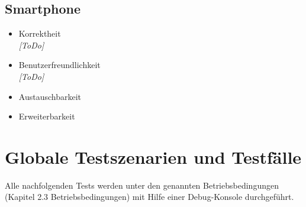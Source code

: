 \documentclass[10pt,a4paper]{article}
\begin{document}
		\subsection{Smartphone}
			\begin{itemize}
				\item Korrektheit
					\\ \textsl{[ToDo]}
				\item Benutzerfreundlichkeit
					\\ \textsl{[ToDo]}
				\item Austauschbarkeit
					\\ \textsl{}						
				\item Erweiterbarkeit
					\\ \textsl{}					
			\end{itemize}
	
	\section{Globale Testszenarien und Testfälle}	
		Alle nachfolgenden Tests werden unter den genannten Betriebsbedingungen (Kapitel 2.3 Betriebsbedingungen)
		mit Hilfe einer Debug-Konsole durchgeführt.
\end{document}

